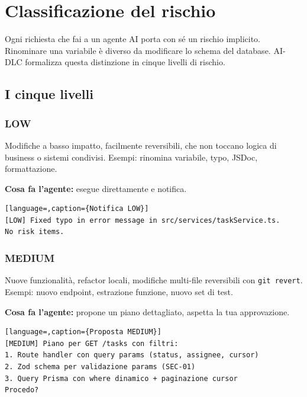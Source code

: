﻿%

\chapter{Classificazione del rischio}
\label{ch:classificazione-rischio}

Ogni richiesta che fai a un agente AI porta con sé un rischio implicito. Rinominare una variabile è diverso da modificare lo schema del database. AI-DLC formalizza questa distinzione in cinque livelli di rischio.

\section{I cinque livelli}
\label{sec:07-cinque-livelli}

\subsection*{LOW}

Modifiche a basso impatto, facilmente reversibili, che non toccano logica di business o sistemi condivisi. Esempi: rinomina variabile, typo, JSDoc, formattazione.

\textbf{Cosa fa l'agente:} esegue direttamente e notifica.

\begin{lstlisting}[language=,caption={Notifica LOW}]
[LOW] Fixed typo in error message in src/services/taskService.ts.
No risk items.
\end{lstlisting}

\subsection*{MEDIUM}

Nuove funzionalità, refactor locali, modifiche multi-file reversibili con \texttt{git revert}. Esempi: nuovo endpoint, estrazione funzione, nuovo set di test.

\textbf{Cosa fa l'agente:} propone un piano dettagliato, aspetta la tua approvazione.

\begin{lstlisting}[language=,caption={Proposta MEDIUM}]
[MEDIUM] Piano per GET /tasks con filtri:
1. Route handler con query params (status, assignee, cursor)
2. Zod schema per validazione params (SEC-01)
3. Query Prisma con where dinamico + paginazione cursor
Procedo?
\end{lstlisting}

